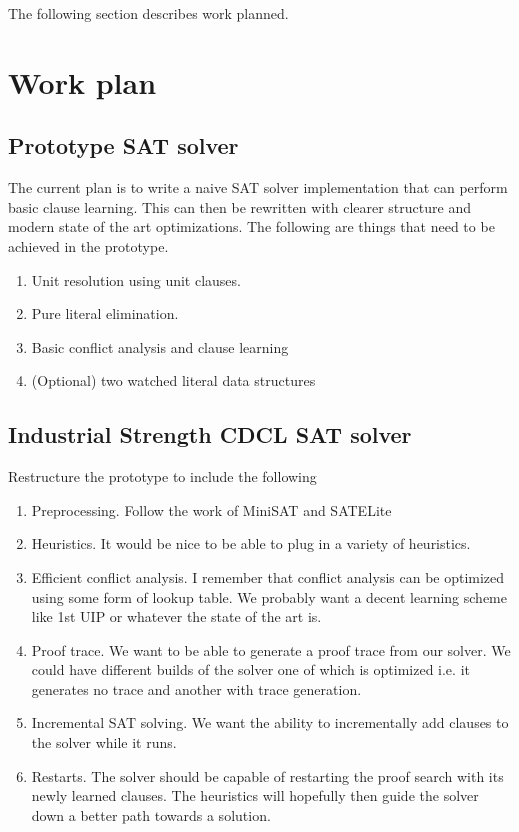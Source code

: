 The following section describes work planned.

\section{Work plan}

\subsection{Prototype SAT solver}
The current plan is to write a naive SAT solver implementation that can perform basic clause learning. This can then be rewritten with clearer structure and modern state of the art optimizations.
The following are things that need to be achieved in the prototype.
\begin{enumerate}
\item Unit resolution using unit clauses.
\item Pure literal elimination.
\item Basic conflict analysis and clause learning
\item (Optional) two watched literal data structures
\end{enumerate}

\subsection{Industrial Strength CDCL SAT solver}
Restructure the prototype to include the following

\begin{enumerate}
\item Preprocessing. Follow the work of MiniSAT and SATELite
\item Heuristics. It would be nice to be able to plug in a variety of heuristics.
\item Efficient conflict analysis. I remember that conflict analysis can be optimized using some form of lookup table. We probably want a decent learning scheme like 1st UIP or whatever the state of the art is.
\item Proof trace. We want to be able to generate a proof trace from our solver. We could have different builds of the solver one of which is optimized i.e. it generates no trace and another with trace generation.
\item Incremental SAT solving. We want the ability to incrementally add clauses to the solver while it runs.
\item Restarts. The solver should be capable of restarting the proof search with its newly learned clauses. The heuristics will hopefully then guide the solver down a better path towards a solution.
\end{enumerate}

